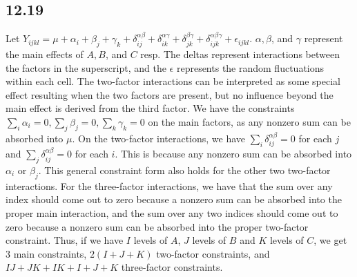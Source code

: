 \documentclass{article}
\newcommand{\ep}{\epsilon}
\begin{document}
\subsection*{12.19}
Let $Y_{ijkl}=\mu+\alpha_i+\beta_j+\gamma_k+\delta^{\alpha\beta}_{ij}+\delta^{\alpha\gamma}_{ik}+\delta^{\beta\gamma}_{jk}+\delta^{\alpha\beta\gamma}_{ijk}+\ep_{ijkl}$. $\alpha,\beta$, and $\gamma$ represent the main effects of $A,B$, and $C$ resp. The deltas represent interactions between the factors in the superscript, and the $\ep$ represents the random fluctuations within each cell. The two-factor interactions can be interpreted as some special effect resulting when the two factors are present, but no influence beyond the main effect is derived from the third factor. We have the constraints $\sum_i\alpha_i=0,\sum_j\beta_j=0,\sum_k\gamma_k=0$ on the main factors, as any nonzero sum can be absorbed into $\mu$. On the two-factor interactions, we have $\sum_i\delta^{\alpha\beta}_{ij}=0$ for each $j$ and $\sum_j\delta^{\alpha\beta}_{ij}=0$ for each $i$. This is because any nonzero sum can be absorbed into $\alpha_i$ or $\beta_j$. This general constraint form also holds for the other two two-factor interactions. For the three-factor interactions, we have that the sum over any index should come out to zero because a nonzero sum can be absorbed into the proper main interaction, and the sum over any two indices should come out to zero because a nonzero sum can be absorbed into the proper two-factor constraint. Thus, if we have $I$ levels of $A$, $J$ levels of $B$ and $K$ levels of $C$, we get $3$ main constraints, $2(I+J+K)$ two-factor constraints, and $IJ+JK+IK+I+J+K$ three-factor constraints.
\end{document}
